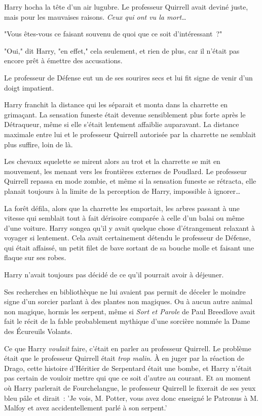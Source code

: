 Harry hocha la tête d'un air lugubre. Le professeur Quirrell avait deviné juste, mais pour les mauvaises raisons. \emph{Ceux qui ont vu la mort…}

"Vous êtes-vous ce faisant souvenu de quoi que ce soit d'intéressant~?"

"Oui," dit Harry, "en effet," cela seulement, et rien de plus, car il n'était pas encore prêt à émettre des accusations.

Le professeur de Défense eut un de ses sourires secs et lui fit signe de venir d'un doigt impatient.

Harry franchit la distance qui les séparait et monta dans la charrette en grimaçant. La sensation funeste était devenue sensiblement plus forte après le Détraqueur, même si elle s'était lentement affaiblie auparavant. La distance maximale entre lui et le professeur Quirrell autorisée par la charrette ne semblait plus suffire, loin de là.

Les chevaux squelette se mirent alors au trot et la charrette se mit en mouvement, les menant vers les frontières externes de Poudlard. Le professeur Quirrell repassa en mode zombie, et même si la sensation funeste se rétracta, elle planait toujours à la limite de la perception de Harry, impossible à ignorer…

La forêt défila, alors que la charrette les emportait, les arbres passant à une vitesse qui semblait tout à fait dérisoire comparée à celle d'un balai ou même d'une voiture. Harry songea qu'il y avait quelque chose d'étrangement relaxant à voyager si lentement. Cela avait certainement détendu le professeur de Défense, qui était affaissé, un petit filet de bave sortant de sa bouche molle et faisant une flaque sur ses robes.

Harry n'avait toujours pas décidé de ce qu'il pourrait avoir à déjeuner.

Ses recherches en bibliothèque ne lui avaient pas permit de déceler le moindre signe d'un sorcier parlant à des plantes non magiques. Ou à aucun autre animal non magique, hormis les serpent, même si \emph{Sort et Parole} de Paul Breedlove avait fait le récit de la fable probablement mythique d'une sorcière nommée la Dame des Écureuils Volants.

Ce que Harry \emph{voulait} faire, c'était en parler au professeur Quirrell. Le problème était que le professeur Quirrell était \emph{trop malin}. À en juger par la réaction de Drago, cette histoire d'Héritier de Serpentard était une bombe, et Harry n'était pas certain de vouloir mettre qui que ce soit d'autre au courant. Et au moment où Harry parlerait de Fourchelangue, le professeur Quirrell le fixerait de ses yeux bleu pâle et dirait~: 'Je vois, M. Potter, vous avez donc enseigné le Patronus à M. Malfoy et avez accidentellement parlé à son serpent.'

